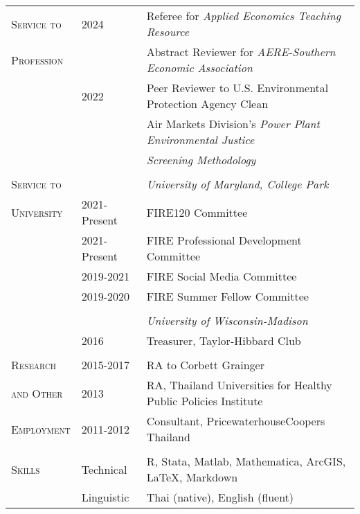\documentclass[letterpaper,11pt,oneside]{article}\usepackage[]{graphicx}\usepackage[]{xcolor}
\begin{document}
                    	
\newpage                   	
\noindent \begin{tabular}{p{1.2in} p{0.9in} l}                         	
\textsc{Service to}   & 2024          & Referee for \textit{Applied Economics Teaching Resource} \\
\textsc{Profession}   &               & Abstract Reviewer for \textit{AERE-Southern Economic Association} \\
                      & 2022          & Peer Reviewer to U.S. Environmental Protection Agency Clean \\
                      &               & Air Markets Division's \textit{Power Plant Environmental Justice} \\
                  		&               & \textit{Screening Methodology} \href{https://www.epa.gov/system/files/documents/2023-06/PPSM Final Peer Review Report.pdf}{\color{blue}{[LINK]}} \\
                      & & \\
                    
\textsc{Service to}		&               & \textit{University of Maryland, College Park} \\
\textsc{University}	  & 2021-Present  & FIRE120 Committee \\
                      & 2021-Present	& FIRE Professional Development Committee \\
                      & 2019-2021 	  & FIRE Social Media Committee \\
                      & 2019-2020 	  & FIRE Summer Fellow Committee \\
                      & & \\  
                      &               & \textit{University of Wisconsin-Madison} \\
                		  & 2016			    & Treasurer, Taylor-Hibbard Club\\
				              & 				      & \\
                        
\textsc{Research}		& 2015-2017	        & RA to Corbett Grainger\\
\textsc{and Other}	& 2013 				      & RA, Thailand Universities for Healthy Public Policies Institute\\
\textsc{Employment}	& 2011-2012 		    & Consultant, PricewaterhouseCoopers Thailand\\
                    & 				          & \\
\textsc{Skills}	& Technical   & R, Stata, Matlab, Mathematica, ArcGIS, \LaTeX, Markdown \\
        		    & Linguistic & Thai (native), English (fluent) \\
\end{tabular}
					
\end{document}
